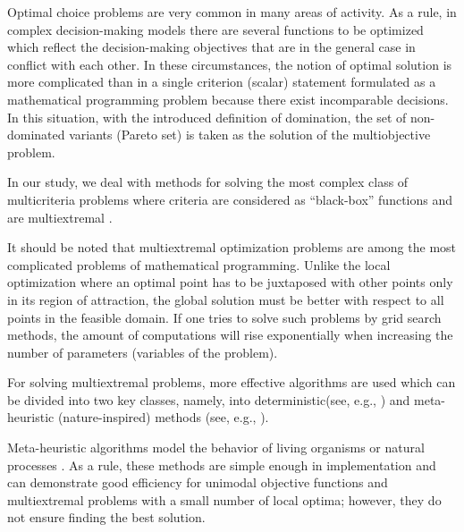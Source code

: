 \documentclass[runningheads]{llncs}
\begin{document}
\cite{Miettinen1999,Ehrgott2005,Pardalos2017,ML_MCO_2023,Evtushenko2014,Deb2002,Durillo2010,Mostaghim2007,NDG09,RC05,ZLT01,Gergel2019_2,Gergel2018,GergelKozinov2020,Marler2004,Strongin2000,Sergeyev2013,SVM_2000,PROB_2004,iOpt_url,Grishagin2015_2}

Optimal choice problems are very common in many areas of activity. As a rule, in complex decision-making models there are several functions to be optimized which reflect the decision-making objectives that are in the general case in conflict with each other. In these circumstances, the notion of optimal solution is more complicated than in a single criterion (scalar) statement formulated as a mathematical programming problem because there exist incomparable decisions. In this situation, with the introduced definition of domination, the set of non-dominated variants (Pareto set) is taken as the solution of the multiobjective problem.

In our study, we deal with methods for solving the most complex class of multicriteria problems where criteria are considered as ``black-box'' functions and are multiextremal \cite{Miettinen1999,Ehrgott2005,Pardalos2017,Strongin2000,Sergeyev2013}.

It should be noted that multiextremal optimization problems are among the most complicated problems of mathematical programming. Unlike the local optimization where an optimal point has to be juxtaposed with other points only in its region of attraction, the global solution must be better with respect to all points in the feasible domain. If one tries to solve such problems by grid search methods, the amount of computations will rise exponentially when increasing the number of parameters (variables of the problem).

For solving multiextremal problems, more effective algorithms are used which can be divided into two key classes, namely, into deterministic(see, e.g., \cite{Evtushenko2014,Gergel2018,GergelKozinov2020,Paulavicius2020,Jones2021}) and meta-heuristic (nature-inspired) methods (see, e.g., \cite{Battiti2009,Gendreau2010,Eiben2015}).

Meta-heuristic algorithms model the behavior of living organisms or natural processes \cite{Deb2002,Durillo2010,Mostaghim2007,NDG09,RC05,ZLT01}. As a rule, these methods are simple enough in implementation and can demonstrate good efficiency for unimodal objective functions and multiextremal problems with a small number of local optima; however, they do not ensure finding the best solution.
\end{document}
